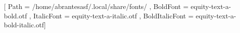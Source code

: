 

\ifxetex
   \usepackage[tuenc,no-math]{fontspec}
   \setmainfont{equity-text-a-regular.otf}[
      Path           = /home/abrantesasf/.local/share/fonts/ ,
      BoldFont       = equity-text-a-bold.otf                ,
      ItalicFont     = equity-text-a-italic.otf              ,
      BoldItalicFont = equity-text-a-bold-italic.otf]
\else
   \usepackage[T1]{fontenc}
   \usepackage[utf8]{inputenc}
   \renewcommand{\familydefault}{ppl}
\fi
